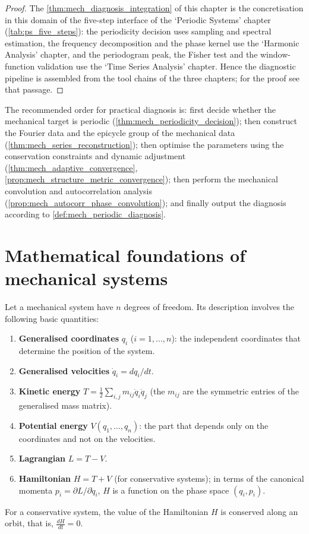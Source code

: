 \begin{proof}
The \cref{thm:mech_diagnosis_integration} of this chapter is the concretisation in this domain of the five-step interface of the `Periodic Systems' chapter (\cref{tab:ps_five_steps}):
the periodicity decision uses sampling and spectral estimation, the frequency decomposition and the phase kernel use the `Harmonic Analysis' chapter, and the periodogram peak, the Fisher test and the
window-function validation use the `Time Series Analysis' chapter. Hence the diagnostic pipeline is assembled from the tool chains of the three chapters; for the proof see that passage.
\end{proof}

\begin{remark}\label{rem:mech_integration_order}
The recommended order for practical diagnosis is: first decide whether the mechanical target is periodic (\cref{thm:mech_periodicity_decision}); then construct the Fourier data and the epicycle group of the mechanical data (\cref{thm:mech_series_reconstruction}); then optimise the parameters using the conservation constraints and dynamic adjustment (\cref{thm:mech_adaptive_convergence}, \cref{prop:mech_structure_metric_convergence}); then perform the mechanical convolution and autocorrelation analysis (\cref{prop:mech_autocorr_phase_convolution}); and finally output the diagnosis according to \cref{def:mech_periodic_diagnosis}.
\end{remark}

\section{Mathematical foundations of mechanical systems}

\begin{definition}\label{def:mechanical_quantities}
Let a mechanical system have $n$ degrees of freedom. Its description involves the following basic quantities:
\begin{enumerate}[label=(\roman*)]
    \item \textbf{Generalised coordinates} $q_i$ ($i = 1, \dots, n$): the independent coordinates that determine the position of the system.
    \item \textbf{Generalised velocities} $\dot{q}_i = dq_i/dt$.
    \item \textbf{Kinetic energy} $T = \frac{1}{2}\sum_{i,j} m_{ij}\dot{q}_i\dot{q}_j$ (the $m_{ij}$ are the symmetric entries of the generalised mass matrix).
    \item \textbf{Potential energy} $V(q_1, \dots, q_n)$: the part that depends only on the coordinates and not on the velocities.
    \item \textbf{Lagrangian} $L = T - V$.
    \item \textbf{Hamiltonian} $H = T + V$ (for conservative systems); in terms of the canonical momenta $p_i = \partial L/\partial\dot{q}_i$, $H$ is a function on the phase space $(q_i, p_i)$.
\end{enumerate}
For a conservative system, the value of the Hamiltonian $H$ is conserved along an orbit, that is, $\frac{dH}{dt} = 0$.
\end{definition}

